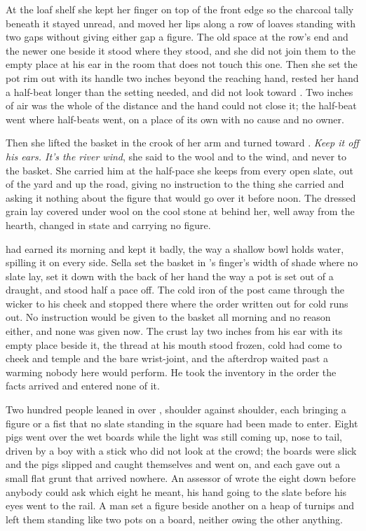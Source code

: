 At the loaf shelf she kept her finger on top of the front edge so the charcoal tally beneath it stayed unread, and moved her lips along a row of loaves standing with two gaps without giving either gap a figure. The old space at the row's end and the newer one beside it stood where they stood, and she did not join them to the empty place at his ear in the room that does not touch this one. Then she set the pot rim out with its handle two inches beyond the reaching hand, rested her hand a half-beat longer than the setting needed, and did not look toward . Two inches of air was the whole of the distance and the hand could not close it; the half-beat went where half-beats went, on a place of its own with no cause and no owner.

Then she lifted the basket in the crook of her arm and turned toward . \emph{Keep it off his ears. It's the river wind}, she said to the wool and to the wind, and never to the basket. She carried him at the half-pace she keeps from every open slate, out of the yard and up the road, giving no instruction to the thing she carried and asking it nothing about the figure that would go over it before noon. The dressed grain lay covered under wool on the cool stone at  behind her, well away from the hearth, changed in state and carrying no figure.

\scenebreak

 had earned its morning and kept it badly, the way a shallow bowl holds water, spilling it on every side. Sella set the basket in 's finger's width of shade where no slate lay, set it down with the back of her hand the way a pot is set out of a draught, and stood half a pace off. The cold iron of the post came through the wicker to his cheek and stopped there where the order written out for cold runs out. No instruction would be given to the basket all morning and no reason either, and none was given now. The crust lay two inches from his ear with its empty place beside it, the thread at his mouth stood frozen, cold had come to cheek and temple and the bare wrist-joint, and the afterdrop waited past a warming nobody here would perform. He took the inventory in the order the facts arrived and entered none of it.

Two hundred people leaned in over , shoulder against shoulder, each bringing a figure or a fist that no slate standing in the square had been made to enter. Eight pigs went over the wet boards while the light was still coming up, nose to tail, driven by a boy with a stick who did not look at the crowd; the boards were slick and the pigs slipped and caught themselves and went on, and each gave out a small flat grunt that arrived nowhere. An assessor of  wrote the eight down before anybody could ask which eight he meant, his hand going to the slate before his eyes went to the rail. A man set a figure beside another on a heap of turnips and left them standing like two pots on a board, neither owing the other anything.

